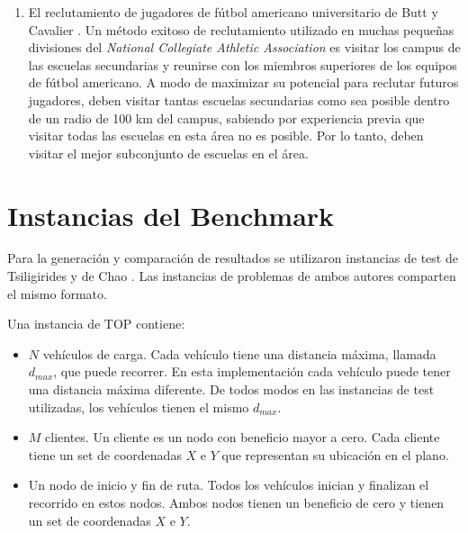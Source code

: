 \begin{enumerate}[i]
\item

El reclutamiento de jugadores de fútbol americano universitario de Butt y Cavalier \cite{ButtCavalier}. Un método exitoso de reclutamiento utilizado en muchas pequeñas divisiones del \textit{National Collegiate Athletic Association} es visitar los campus de las escuelas secundarias y reunirse con los miembros superiores de los equipos de fútbol americano. A modo de maximizar su potencial para reclutar futuros jugadores, deben visitar tantas escuelas secundarias como sea posible dentro de un radio de 100 km del campus, sabiendo por experiencia previa que visitar todas las escuelas en esta área no es posible. Por lo tanto, deben visitar el mejor subconjunto de escuelas en el área.

\end{enumerate}

\section{Instancias del Benchmark}

Para la generación y comparación de resultados se utilizaron instancias de test de Tsiligirides y de Chao \cite{IntancesChaoTsiligirides}. Las instancias de problemas de ambos autores comparten el mismo formato. 

\bigskip

\begin{minipage}{\textwidth}
Una instancia de TOP contiene:

\begin{itemize}
  \item $N$ vehículos de carga. Cada vehículo tiene una distancia máxima, llamada $d_{max}$, que puede recorrer. En esta implementación cada vehículo puede tener una distancia máxima diferente. De todos modos en las instancias de test utilizadas, los vehículos tienen el mismo $d_{max}$.
  \item $M$ clientes. Un cliente es un nodo con beneficio mayor a cero. Cada cliente tiene un set de coordenadas $X$ e $Y$ que representan su ubicación en el plano.
  \item Un nodo de inicio y fin de ruta. Todos los vehículos inician y finalizan el recorrido en estos nodos. Ambos nodos tienen un beneficio de cero y tienen un set de coordenadas $X$ e $Y$.
\end{itemize}
\end{minipage}

\bigskip

